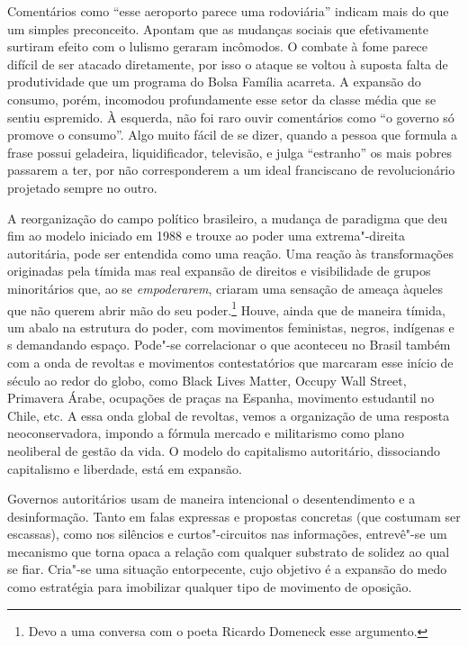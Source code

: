 Comentários como ``esse aeroporto parece uma rodoviária'' indicam mais
do que um simples preconceito. Apontam que as mudanças sociais que
efetivamente surtiram efeito com o lulismo geraram incômodos. O combate
à fome parece difícil de ser atacado diretamente, por isso o ataque se
voltou à suposta falta de produtividade que um programa do Bolsa Família
acarreta. A expansão do consumo, porém, incomodou profundamente esse
setor da classe média que se sentiu espremido. À esquerda, não foi
raro ouvir comentários como ``o governo só promove o consumo''. Algo
muito fácil de se dizer, quando a pessoa que formula a frase possui
geladeira, liquidificador, televisão, e julga ``estranho'' os mais
pobres passarem a ter, por não corresponderem a um ideal franciscano de
revolucionário projetado sempre no outro.

A reorganização do campo político brasileiro, a mudança de paradigma que
deu fim ao modelo iniciado em 1988 e trouxe ao poder uma extrema"-direita
autoritária, pode ser entendida como uma reação. Uma reação às
transformações originadas pela tímida mas real expansão de direitos e
visibilidade de grupos minoritários que, ao se \emph{empoderarem},
criaram uma sensação de ameaça àqueles que não querem abrir mão do seu
poder.\footnote{Devo a uma conversa com o poeta Ricardo
  Domeneck esse argumento.} Houve, ainda que de maneira tímida, um
abalo na estrutura do poder, com movimentos feministas, negros,
indígenas e s demandando espaço. Pode"-se correlacionar o que aconteceu no Brasil
também com a onda de revoltas e movimentos contestatórios que marcaram
esse início de século  ao redor do globo, como Black Lives Matter,
Occupy Wall Street, Primavera Árabe, ocupações de praças na Espanha,
movimento estudantil no Chile, etc. A essa onda global de revoltas,
vemos a organização de uma resposta neoconservadora, impondo a fórmula
mercado e militarismo como plano neoliberal de gestão da vida. O modelo
do capitalismo autoritário, dissociando capitalismo e liberdade, está em
expansão.

Governos autoritários usam de
maneira intencional o desentendimento e a desinformação. Tanto em falas
expressas e propostas concretas (que costumam ser escassas), como nos
silêncios e curtos"-circuitos nas informações, entrevê"-se um mecanismo
que torna opaca a relação com qualquer substrato de solidez ao qual
se fiar. Cria"-se uma situação entorpecente, cujo objetivo é a expansão
do medo como estratégia para imobilizar qualquer tipo de movimento de
oposição.

